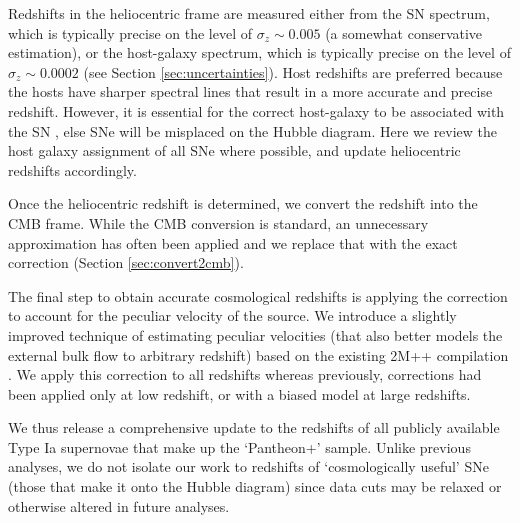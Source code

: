 \documentclass[
  journal=pasa,
  manuscript=research-paper,
  year=2022,
]{cup-journal}
\begin{document}
Redshifts in the heliocentric frame are measured either from the SN spectrum, which is typically precise on the level of $\sigma_z\sim0.005$ (a somewhat conservative estimation), or the host-galaxy spectrum, which is typically precise on the level of $\sigma_z\sim0.0002$ (see Section \ref{sec:uncertainties}).
Host redshifts are preferred because the hosts have sharper spectral lines that result in a more accurate and precise redshift. 
However, it is essential for the correct host-galaxy to be associated with the SN \citep{Gupta2016}, else SNe will be misplaced on the Hubble diagram.  
Here we review the host galaxy assignment of all SNe where possible, and update heliocentric redshifts accordingly.   

Once the heliocentric redshift is determined, we convert the redshift into the CMB frame.  
While the CMB conversion is standard, an unnecessary approximation has often been applied \citep[see, e.g.][and references therein]{Carr2021} and we replace that with the exact correction (Section \ref{sec:convert2cmb}).  

The final step to obtain accurate cosmological redshifts is applying the correction to account for the peculiar velocity of the source.  
We introduce a slightly improved technique of estimating peculiar velocities (that also better models the external bulk flow to arbitrary redshift) based on the existing 2M++ compilation \citep{Carrick2015}.
We apply this correction to all redshifts whereas previously, corrections had been applied only at low redshift, or with a biased model at large redshifts.

We thus release a comprehensive update to the redshifts of all publicly available Type Ia supernovae that make up the `Pantheon+' sample.  
Unlike previous analyses, we do not isolate our work to redshifts of `cosmologically useful' SNe (those that make it onto the Hubble diagram) since data cuts may be relaxed or otherwise altered in future analyses.  
\end{document}
